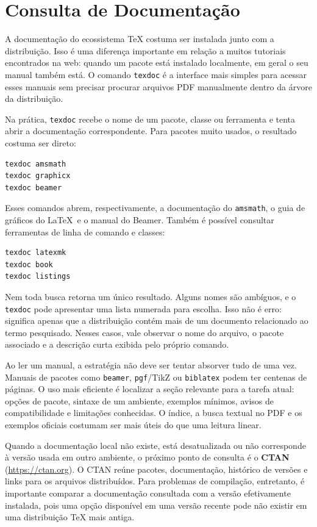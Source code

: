\section{Consulta de Documentação}

A documentação do ecossistema TeX costuma ser instalada junto com a distribuição. Isso é uma diferença importante em relação a muitos tutoriais encontrados na web: quando um pacote está instalado localmente, em geral o seu manual também está. O comando \texttt{texdoc} é a interface mais simples para acessar esses manuais sem precisar procurar arquivos PDF manualmente dentro da árvore da distribuição.

Na prática, \texttt{texdoc} recebe o nome de um pacote, classe ou ferramenta e tenta abrir a documentação correspondente. Para pacotes muito usados, o resultado costuma ser direto:

\begin{lstlisting}[language=bash]
texdoc amsmath
texdoc graphicx
texdoc beamer
\end{lstlisting}

Esses comandos abrem, respectivamente, a documentação do \texttt{amsmath}, o guia de gráficos do \LaTeX\ e o manual do Beamer. Também é possível consultar ferramentas de linha de comando e classes:

\begin{lstlisting}[language=bash]
texdoc latexmk
texdoc book
texdoc listings
\end{lstlisting}

Nem toda busca retorna um único resultado. Alguns nomes são ambíguos, e o \texttt{texdoc} pode apresentar uma lista numerada para escolha. Isso não é erro: significa apenas que a distribuição contém mais de um documento relacionado ao termo pesquisado. Nesses casos, vale observar o nome do arquivo, o pacote associado e a descrição curta exibida pelo próprio comando.

Ao ler um manual, a estratégia não deve ser tentar absorver tudo de uma vez. Manuais de pacotes como \texttt{beamer}, \texttt{pgf}/TikZ ou \texttt{biblatex} podem ter centenas de páginas. O uso mais eficiente é localizar a seção relevante para a tarefa atual: opções de pacote, sintaxe de um ambiente, exemplos mínimos, avisos de compatibilidade e limitações conhecidas. O índice, a busca textual no PDF e os exemplos oficiais costumam ser mais úteis do que uma leitura linear.

Quando a documentação local não existe, está desatualizada ou não corresponde à versão usada em outro ambiente, o próximo ponto de consulta é o \textbf{CTAN} (\url{https://ctan.org}). O CTAN reúne pacotes, documentação, histórico de versões e links para os arquivos distribuídos. Para problemas de compilação, entretanto, é importante comparar a documentação consultada com a versão efetivamente instalada, pois uma opção disponível em uma versão recente pode não existir em uma distribuição TeX mais antiga.


